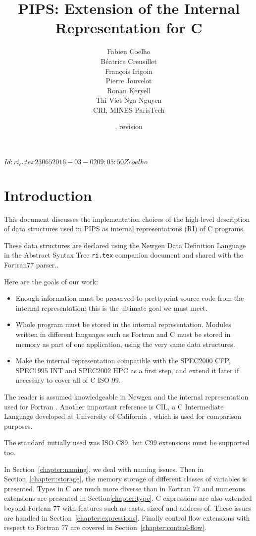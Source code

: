 \documentclass[a4paper]{report}
\title{PIPS: Extension of the Internal Representation for C}
\author{Fabien Coelho \\
  Béatrice Creusillet \\
  François Irigoin \\
  Pierre Jouvelot \\
  Ronan Keryell \\
  Thi Viet Nga Nguyen \\
  CRI, MINES ParisTech}
\date{\svnInfoLongDate{}, revision \svnInfoRevision}
\begin{document}
\svnInfo $Id: ri_C.tex 23065 2016-03-02 09:05:50Z coelho $

\noindent
\maketitle
\tableofcontents


\chapter*{Introduction}

This document discusses the implementation choices of the high-level
description of data structures used in PIPS as internal representations
(RI) of C programs.

These data structures are declared using the Newgen Data Definition
Language in the Abstract Syntax Tree \texttt{ri.tex} companion
document and shared with the Fortran77 parser..

Here are the goals of our work:
\begin{itemize}
\item Enough information must be preserved to prettyprint source code
  from the internal representation: this is the ultimate goal we must
  meet.
\item Whole program must be stored in the internal
  representation. Modules written in different languages such as
  Fortran and C must be stored in memory as part of one application,
  using the very same data structures.
\item Make the internal representation compatible with the SPEC2000
  CFP, SPEC1995 INT and SPEC2002 HPC as a first step, and extend it
  later if necessary to cover all of C ISO 99.
\end{itemize}
The reader is assumed knowledgeable in Newgen \cite{Jouv90} and the
internal representation used for Fortran \cite{Coel01}. Another
important reference is CIL, a C Intermediate Language developed at
University of California \cite{Necu02}, which is used for comparison
purposes.

The standard initially used was ISO C89, but C99 extensions must be
supported too.

In Section~\ref{chapter:naming}, we deal with naming issues. Then in
Section~\ref{chapter::storage}, the memory storage of different
classes of variables is presented. Types in C are much more diverse
than in Fortran 77 and numerous extensions are presented in
Section\ref{chapter:type}. C expressions are also extended beyond
Fortran 77 with features such as casts, sizeof and address-of. These
issues are handled in Section~\ref{chapter:expressions}. Finally
control flow extensions with respect to Fortran 77 are covered in
Section~\ref{chapter:control-flow}.
\end{document}
